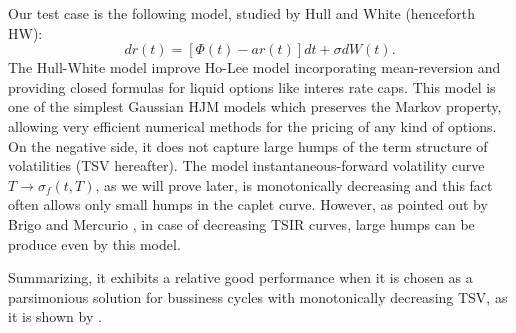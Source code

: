 Our test case is the following model, studied by Hull and White
\cite{HW:1990} (henceforth HW):
\begin{equation}
\label{HW}
dr(t)=\left[ \Phi(t)-a r(t)\right] dt + \sigma dW(t).
\end{equation} The Hull-White model improve Ho-Lee model incorporating
mean-reversion and providing closed formulas for liquid options like
interes rate caps. This model is one of the simplest Gaussian HJM
models which preserves the Markov property, allowing very efficient
numerical methods for the pricing of any kind of options. On the
negative side, it does not capture large humps of the term structure
of volatilities (TSV hereafter). The model instantaneous-forward
volatility curve $T \to \sigma_f(t,T)$, as we will prove later, is
monotonically decreasing and this fact often allows only small humps
in the caplet curve. However, as pointed out by Brigo and Mercurio
\cite[pp. 91--92]{BM:2006}, in case of decreasing TSIR curves, large 
humps can be produce even by this model. 

Summarizing, it exhibits a relative good performance when it is chosen
as a parsimonious solution for bussiness cycles with monotonically
decreasing TSV, as it is shown by \cite{AH:2005}.   %
